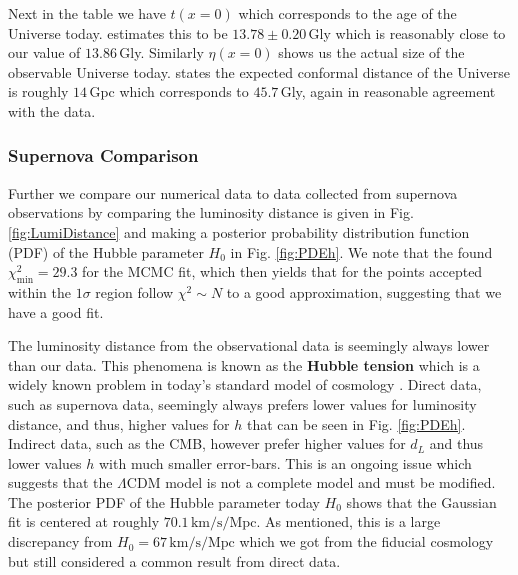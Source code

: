 \documentclass[%
reprint,
 amsmath,amssymb,
 aps,
]{revtex4-2}
\begin{document}
Next in the table we have $t(x=0)$ which corresponds to the age of the Universe today. \cite{Planck:2018vyg} estimates this to be $13.78\pm0.20\,$Gly which is reasonably close to our value of $13.86\,$Gly. Similarly $\eta(x=0)$ shows us the actual size of the observable Universe today. \cite{Gott:2003pf} states the expected conformal distance of the Universe is roughly $14\,$Gpc which corresponds to $45.7\,$Gly, again in reasonable agreement with the data. 
\subsubsection{Supernova Comparison}
Further we compare our numerical data to data collected from supernova observations \cite{SDSS:2014iwm} by comparing the luminosity distance is given in Fig. \ref{fig:LumiDistance} and making a posterior probability distribution function (PDF) of the Hubble parameter $H_0$ in Fig. \ref{fig:PDEh}. We note that the found $\chi^2_\text{min}=29.3$ for the MCMC fit, which then yields that for the points accepted within the $1\sigma$ region follow $\chi^2\sim N$ to a good approximation, suggesting that we have a good fit. 

The luminosity distance from the observational data is seemingly always lower than our data. This phenomena is known as the \textbf{Hubble tension} which is a widely known problem in today's standard model of cosmology \cite{Di_Valentino_2021}. Direct data, such as supernova data, seemingly always prefers lower values for luminosity distance, and thus, higher values for $h$ that can be seen in Fig. \ref{fig:PDEh}. Indirect data, such as the CMB, however prefer higher values for $d_L$ and thus lower values $h$ with much smaller error-bars. This is an ongoing issue which suggests that the $\Lambda$CDM model is not a complete model and must be modified. The posterior PDF of the Hubble parameter today $H_0$ shows that the Gaussian fit is centered at roughly $70.1\,\text{km/s/Mpc}$. As mentioned, this is a large discrepancy from $H_0=67\,\text{km/s/Mpc}$ which we got from the fiducial cosmology but still considered a common result from direct data. 
\end{document}
